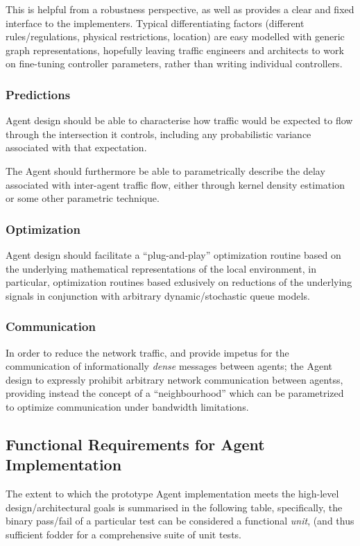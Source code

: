 \documentclass{report}
\begin{document}
This is helpful from a robustness perspective, as well as provides a clear and fixed interface to the implementers.
Typical differentiating factors (different rules/regulations, physical restrictions, location) are easy modelled with generic graph representations, hopefully leaving traffic engineers and architects to work on fine-tuning controller parameters, rather than writing individual controllers.

\subsubsection{Predictions}
Agent design should be able to characterise how traffic would be expected to flow through the intersection it controls, including any probabilistic variance associated with that expectation.

The Agent should furthermore be able to parametrically describe the delay associated with inter-agent traffic flow, either through kernel density estimation or some other parametric technique.

\subsubsection{Optimization}
Agent design should facilitate a ``plug-and-play'' optimization routine based on the underlying mathematical representations of the local environment, in particular, optimization routines based exlusively on reductions of the underlying signals in conjunction with arbitrary dynamic/stochastic queue models.

\subsubsection{Communication}
In order to reduce the network traffic, and provide impetus for the communication of informationally \emph{dense} messages between agents; the Agent design to expressly prohibit arbitrary network communication between agentss, providing instead the concept of a ``neighbourhood'' which can be parametrized to optimize communication under bandwidth limitations.

\subsection{Functional Requirements for Agent Implementation}

The extent to which the prototype Agent implementation meets the high-level design/architectural goals is summarised in the following table, specifically, the binary pass/fail of a particular test can be considered a functional \emph{unit}, (and thus sufficient fodder for a comprehensive suite of unit tests.
\end{document}
